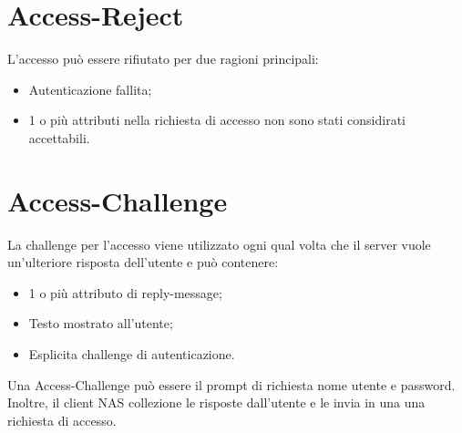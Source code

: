 \documentclass{book}
\theoremstyle{remark}
\begin{document}
\section{Access-Reject}
L'accesso può essere rifiutato per due ragioni principali:\begin{itemize}
	\item Autenticazione fallita;\@
	\item 1 o più attributi nella richiesta di accesso non sono stati considirati accettabili\@.
\end{itemize}
\section{Access-Challenge}
La challenge per l'accesso viene utilizzato ogni qual volta che il server vuole un'ulteriore risposta dell'utente e può contenere:\begin{itemize}
	\item 1 o più attributo di reply-message;\@
	\item Testo mostrato all'utente;\@
	\item Esplicita challenge di autenticazione\@.
\end{itemize} Una Access-Challenge può essere il prompt di richiesta nome utente e password\@.\newline
Inoltre, il client NAS collezione le risposte dall'utente e le invia in una una richiesta di accesso\@.
\end{document}
